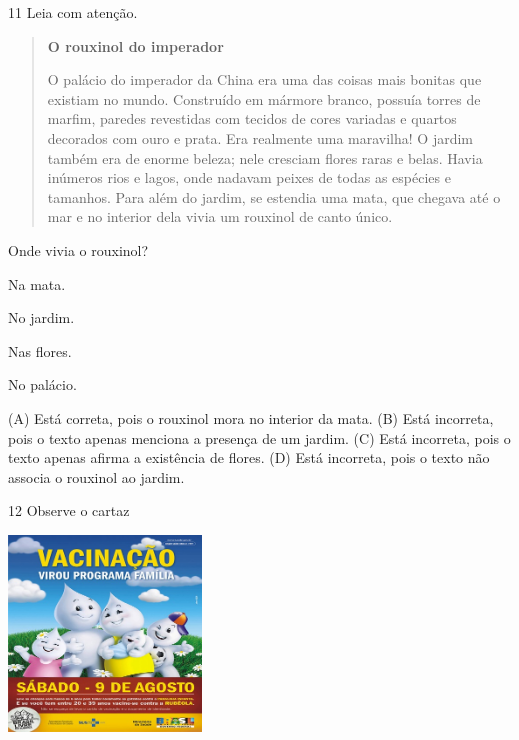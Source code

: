 \num{11} Leia com atenção.

\begin{quote}
\textbf{O rouxinol do imperador}

O palácio do imperador da China era uma das coisas mais
bonitas que existiam no mundo. Construído em mármore
branco, possuía torres de marfim, paredes revestidas com
tecidos de cores variadas e quartos decorados com ouro e
prata. Era realmente uma maravilha!
O jardim também era de enorme beleza; nele cresciam
flores raras e belas. Havia inúmeros rios e lagos, onde
nadavam peixes de todas as espécies e tamanhos.
Para além do jardim, se estendia uma mata, que
chegava até o mar e no interior dela vivia um rouxinol de
canto único.
\end{quote}


Onde vivia o rouxinol?

\begin{escolha}
\item Na mata.

\item No jardim.

\item Nas flores.

\item No palácio.
\end{escolha}


(A) Está correta, pois o rouxinol mora no interior da mata.
(B) Está incorreta, pois o texto apenas menciona a presença de um jardim.
(C) Está incorreta, pois o texto apenas afirma a existência de flores.
(D) Está incorreta, pois o texto não associa o rouxinol ao jardim.

\num{12} Observe o cartaz

\includegraphics[width=2.01806in,height=2.05069in]{media/image159.jpeg}

